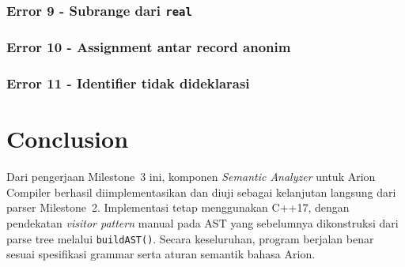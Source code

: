 \documentclass[11pt,a4paper]{article}
\begin{document}
\subsubsection*{Error 9 - Subrange dari \texttt{real}}





\subsubsection*{Error 10 - Assignment antar record anonim}





\subsubsection*{Error 11 - Identifier tidak dideklarasi}





\newpage
\section{Conclusion}

Dari pengerjaan Milestone~3 ini, komponen \textit{Semantic Analyzer} untuk
Arion Compiler berhasil diimplementasikan dan diuji sebagai kelanjutan
langsung dari parser Milestone~2. Implementasi tetap menggunakan C++17,
dengan pendekatan \textit{visitor pattern} manual pada AST yang sebelumnya
dikonstruksi dari parse tree melalui \texttt{buildAST()}. Secara keseluruhan,
program berjalan benar sesuai spesifikasi grammar serta aturan semantik
bahasa Arion.
\end{document}
